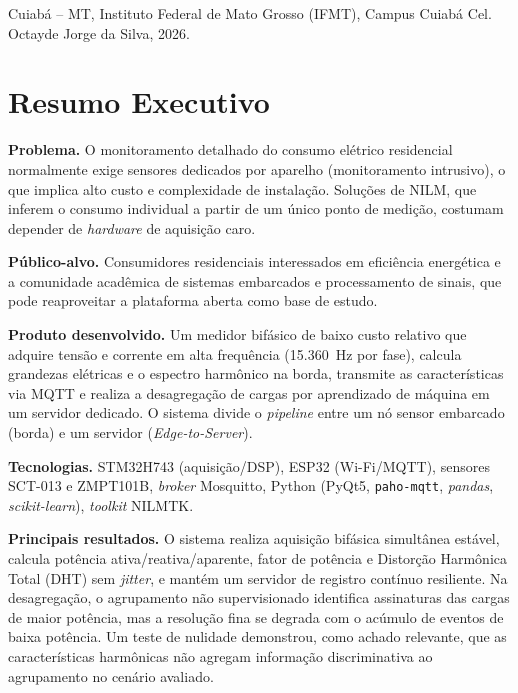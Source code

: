 \documentclass[12pt,a4paper]{article}
\begin{document}
Cuiab\'a -- MT, Instituto Federal de Mato Grosso (IFMT), Campus Cuiab\'a Cel.
Octayde Jorge da Silva, 2026.

\section{Resumo Executivo}

\textbf{Problema.} O monitoramento detalhado do consumo el\'etrico residencial
normalmente exige sensores dedicados por aparelho (monitoramento intrusivo), o que
implica alto custo e complexidade de instala\c{c}\~ao. Solu\c{c}\~oes de NILM,
que inferem o consumo individual a partir de um \'unico ponto de medi\c{c}\~ao,
costumam depender de \textit{hardware} de aquisi\c{c}\~ao caro.

\textbf{P\'ublico-alvo.} Consumidores residenciais interessados em efici\^encia
energ\'etica e a comunidade acad\^emica de sistemas embarcados e processamento de
sinais, que pode reaproveitar a plataforma aberta como base de estudo.

\textbf{Produto desenvolvido.} Um medidor bif\'asico de baixo custo relativo que
adquire tens\~ao e corrente em alta frequ\^encia (15{.}360~Hz por fase), calcula
grandezas el\'etricas e o espectro harm\^onico na borda, transmite as
caracter\'isticas via MQTT e realiza a desagrega\c{c}\~ao de cargas por
aprendizado de m\'aquina em um servidor dedicado. O sistema divide o
\textit{pipeline} entre um n\'o sensor embarcado (borda) e um servidor
(\textit{Edge-to-Server}).

\textbf{Tecnologias.} STM32H743 (aquisi\c{c}\~ao/DSP), ESP32 (Wi-Fi/MQTT),
sensores SCT-013 e ZMPT101B, \textit{broker} Mosquitto, Python (PyQt5,
\texttt{paho-mqtt}, \textit{pandas}, \textit{scikit-learn}), \textit{toolkit}
NILMTK.

\textbf{Principais resultados.} O sistema realiza aquisi\c{c}\~ao bif\'asica
simult\^anea est\'avel, calcula pot\^encia ativa/reativa/aparente, fator de
pot\^encia e Distor\c{c}\~ao Harm\^onica Total (DHT) sem \textit{jitter}, e mant\'em
um servidor de registro cont\'inuo resiliente. Na desagrega\c{c}\~ao, o agrupamento
n\~ao supervisionado identifica assinaturas das cargas de maior pot\^encia, mas a
resolu\c{c}\~ao fina se degrada com o ac\'umulo de eventos de baixa pot\^encia. Um
teste de nulidade demonstrou, como achado relevante, que as caracter\'isticas
harm\^onicas n\~ao agregam informa\c{c}\~ao discriminativa ao agrupamento no
cen\'ario avaliado.
\end{document}
